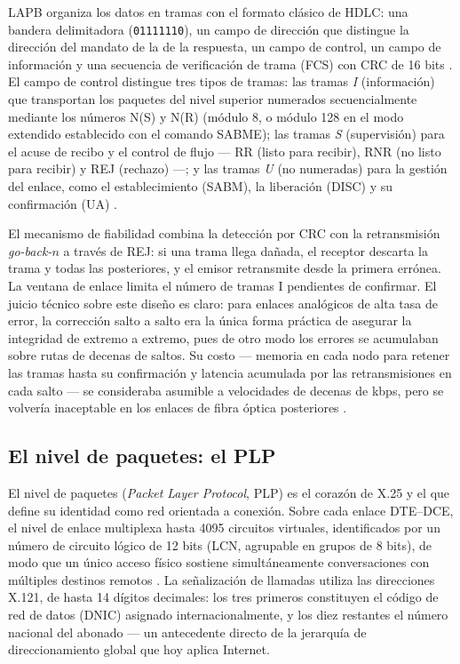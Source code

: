 \documentclass[12pt,a4paper]{article}
\begin{document}
LAPB organiza los datos en tramas con el formato clásico de HDLC: una bandera delimitadora (\texttt{01111110}), un campo de dirección que distingue la dirección del mandato de la de la respuesta, un campo de control, un campo de información y una secuencia de verificación de trama (FCS) con CRC de 16 bits \cite{tanenbaum2012, stallings2004}. El campo de control distingue tres tipos de tramas: las tramas \emph{I} (información) que transportan los paquetes del nivel superior numerados secuencialmente mediante los números N(S) y N(R) (módulo 8, o módulo 128 en el modo extendido establecido con el comando SABME); las tramas \emph{S} (supervisión) para el acuse de recibo y el control de flujo --- RR (listo para recibir), RNR (no listo para recibir) y REJ (rechazo) ---; y las tramas \emph{U} (no numeradas) para la gestión del enlace, como el establecimiento (SABM), la liberación (DISC) y su confirmación (UA) \cite{tanenbaum2012}.

El mecanismo de fiabilidad combina la detección por CRC con la retransmisión \emph{go-back-$n$} a través de REJ: si una trama llega dañada, el receptor descarta la trama y todas las posteriores, y el emisor retransmite desde la primera errónea. La ventana de enlace limita el número de tramas I pendientes de confirmar. El juicio técnico sobre este diseño es claro: para enlaces analógicos de alta tasa de error, la corrección salto a salto era la única forma práctica de asegurar la integridad de extremo a extremo, pues de otro modo los errores se acumulaban sobre rutas de decenas de saltos. Su costo --- memoria en cada nodo para retener las tramas hasta su confirmación y latencia acumulada por las retransmisiones en cada salto --- se consideraba asumible a velocidades de decenas de kbps, pero se volvería inaceptable en los enlaces de fibra óptica posteriores \cite{bertsekas1992}.

\subsection{El nivel de paquetes: el PLP}

El nivel de paquetes (\emph{Packet Layer Protocol}, PLP) es el corazón de X.25 y el que define su identidad como red orientada a conexión. Sobre cada enlace DTE--DCE, el nivel de enlace multiplexa hasta 4095 circuitos virtuales, identificados por un número de circuito lógico de 12 bits (LCN, agrupable en grupos de 8 bits), de modo que un único acceso físico sostiene simultáneamente conversaciones con múltiples destinos remotos \cite{itux25, rybczynski1980}. La señalización de llamadas utiliza las direcciones X.121, de hasta 14 dígitos decimales: los tres primeros constituyen el código de red de datos (DNIC) asignado internacionalmente, y los diez restantes el número nacional del abonado \cite{itux121} --- un antecedente directo de la jerarquía de direccionamiento global que hoy aplica Internet.
\end{document}
